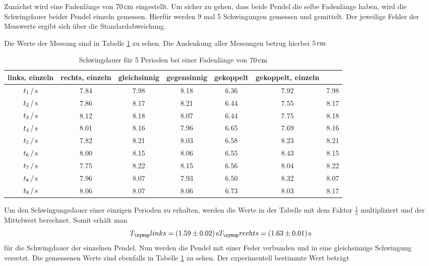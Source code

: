 Zunächst wird eine Fadenlänge von $70\,\si{\centi\meter}$ eingestellt. Um sicher zu gehen, dass
beide Pendel die selbe Fadenlänge haben, wird die Schwingdauer beider Pendel
einzeln gemessen. Hierfür werden 9 mal 5 Schwingungen gemessen und gemittelt.
Der jeweilige Fehler der Messwerte ergibt sich über die Standardabweichung.

Die Werte der Messung sind in Tabelle \ref{tab:70cm} zu sehen. Die Auslenkung
aller Messungen betrug hierbei $5\,\si{\centi\meter}$
\begin{table}[H]
  \centering
  \begin{tabular}{c c c c c c c}
    \toprule
    links, einzeln & rechts, einzeln & gleichsinnig & gegensinnig &gekoppelt&
    gekoppelt, einzeln \\
    \midrule
    $t_1\,/\,\si{\second}$ & 7.84 & 7.98 & 8.18 & 6.36 & 7.92 & 7.98 \\
    $t_2\,/\,\si{\second}$ & 7.86 & 8.17 & 8.21 & 6.44 & 7.55 & 8.17 \\
    $t_3\,/\,\si{\second}$ & 8.12 & 8.18 & 8.07 & 6.44 & 7.75 & 8.18 \\
    $t_4\,/\,\si{\second}$ & 8.01 & 8.16 & 7.96 & 6.65 & 7.69 & 8.16 \\
    $t_5\,/\,\si{\second}$ & 7.82 & 8.21 & 8.03 & 6.58 & 8.23 & 8.21 \\
    $t_6\,/\,\si{\second}$ & 8.00 & 8.15 & 8.06 & 6.55 & 8.43 & 8.15 \\
    $t_7\,/\,\si{\second}$ & 7.75 & 8.22 & 8.15 & 6.56 & 8.04 & 8.22 \\
    $t_8\,/\,\si{\second}$ & 7.96 & 8.07 & 7.93 & 6.50 & 8.32 & 8.07 \\
    $t_9\,/\,\si{\second}$ & 8.06 & 8.07 & 8.06 & 6.73 & 8.03 & 8.17 \\
    \bottomrule
  \end{tabular}
  \caption{Schwingdauer für 5 Perioden bei einer Fadenlänge von $70\,\si{\centi\meter}$}
  \label{tab:70cm}
\end{table}
Um den Schwingungsdauer einer einzigen Perioden zu erhalten, werden die Werte
in der Tabelle mit dem Faktor $\frac{1}{5}$ multipliziert und der Mittelwert
berechnet. Somit erhält man
\begin{equation*}
T_\su{links}=(1.59\pm0.02)\sek
T_\su{rechts}=(1.63\pm0.01)\sek
\end{equation*}
für die Schwingdauer der einzelnen Pendel. Nun werden die Pendel mit einer Feder
verbunden und in eine gleichsinnige Schwingung versetzt. Die gemessenen Werte
sind ebenfalls in Tabelle \ref{tab:70cm} zu sehen. Der experimentell bestimmte
Wert beträgt

